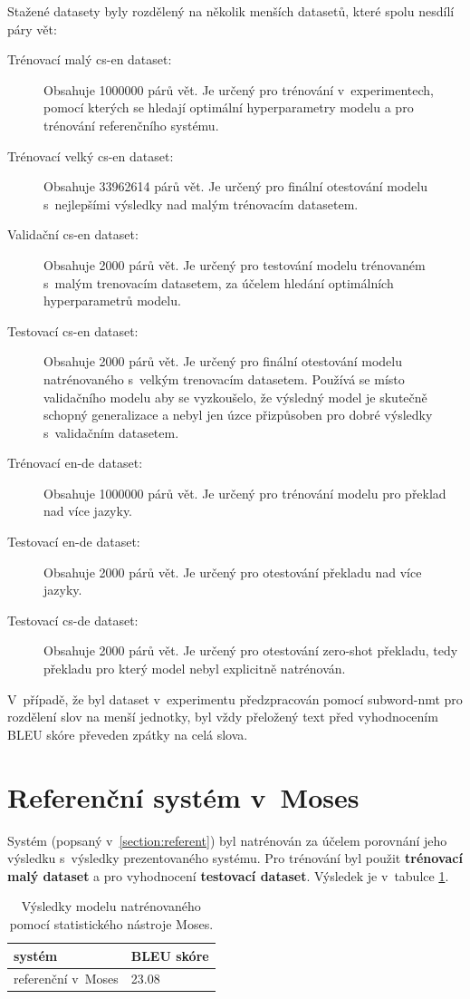 Stažené datasety byly rozdělený na několik menších datasetů, které spolu nesdílí páry vět:
\begin{description}
  \item[Trénovací malý cs-en dataset:] Obsahuje 1000000 párů vět. Je určený pro trénování v~experimentech, pomocí kterých se hledají optimální hyperparametry modelu a pro trénování referenčního systému.
  \item[Trénovací velký cs-en dataset:] Obsahuje 33962614 párů vět. Je určený pro finální otestování modelu s~nejlepšími výsledky nad malým trénovacím datasetem.
  \item[Validační cs-en dataset:] Obsahuje 2000 párů vět. Je určený pro testování modelu trénovaném s~malým trenovacím datasetem, za účelem hledání optimálních hyperparametrů modelu.
  \item[Testovací cs-en dataset:] Obsahuje 2000 párů vět. Je určený pro finální otestování modelu natrénovaného s~velkým trenovacím datasetem. Používá se místo validačního modelu aby se vyzkoušelo, že výsledný model je skutečně schopný generalizace a nebyl jen úzce přizpůsoben pro dobré výsledky s~validačním datasetem.
  \item[Trénovací en-de dataset:] Obsahuje 1000000 párů vět. Je určený pro trénování modelu pro překlad nad více jazyky.
  \item[Testovací en-de dataset:] Obsahuje 2000 párů vět. Je určený pro otestování překladu nad více jazyky.
  \item[Testovací cs-de dataset:] Obsahuje 2000 párů vět. Je určený pro otestování zero-shot překladu, tedy překladu pro který model nebyl explicitně natrénován.
\end{description}

V~případě, že byl dataset v~experimentu předzpracován pomocí subword-nmt pro rozdělení slov na menší jednotky, byl vždy přeložený text před vyhodnocením BLEU skóre převeden zpátky na celá slova.

\section{Referenční systém v~Moses}
Systém (popsaný v~\ref{section:referent}) byl natrénován za účelem porovnání jeho výsledku s~výsledky prezentovaného systému. Pro trénování byl použit \textbf{trénovací malý dataset} a pro vyhodnocení \textbf{testovací dataset}. Výsledek je v~tabulce \ref{table:referent}.

\begin{table}[H]
    \begin{center}
        \begin{tabular}{ll}
          \toprule
          systém & BLEU skóre  \\
          \midrule
          referenční v~Moses & 23.08\\
          \bottomrule
        \end{tabular}
    \end{center}
	\caption{Výsledky modelu natrénovaného pomocí statistického nástroje Moses.}
	\label{table:referent}
\end{table}

